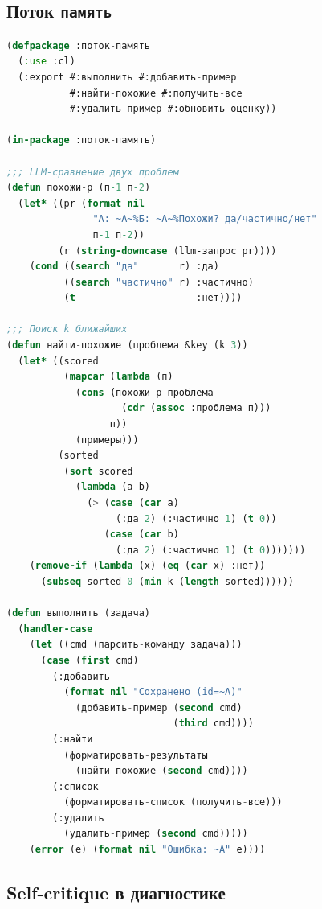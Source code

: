 \documentclass[10pt, oneside]{article}
\begin{document}
\subsection{Поток \texttt{память}}

\begin{lstlisting}[language=CommonLisp,caption={поток-память.lisp}]
(defpackage :поток-память
  (:use :cl)
  (:export #:выполнить #:добавить-пример
           #:найти-похожие #:получить-все
           #:удалить-пример #:обновить-оценку))

(in-package :поток-память)

;;; LLM-сравнение двух проблем
(defun похожи-p (п-1 п-2)
  (let* ((pr (format nil
               "А: ~A~%Б: ~A~%Похожи? да/частично/нет"
               п-1 п-2))
         (r (string-downcase (llm-запрос pr))))
    (cond ((search "да"       r) :да)
          ((search "частично" r) :частично)
          (t                     :нет))))

;;; Поиск k ближайших
(defun найти-похожие (проблема &key (k 3))
  (let* ((scored
          (mapcar (lambda (п)
            (cons (похожи-p проблема
                    (cdr (assoc :проблема п)))
                  п))
            (примеры)))
         (sorted
          (sort scored
            (lambda (a b)
              (> (case (car a)
                   (:да 2) (:частично 1) (t 0))
                 (case (car b)
                   (:да 2) (:частично 1) (t 0)))))))
    (remove-if (lambda (x) (eq (car x) :нет))
      (subseq sorted 0 (min k (length sorted))))))

(defun выполнить (задача)
  (handler-case
    (let ((cmd (парсить-команду задача)))
      (case (first cmd)
        (:добавить
          (format nil "Сохранено (id=~A)"
            (добавить-пример (second cmd)
                             (third cmd))))
        (:найти
          (форматировать-результаты
            (найти-похожие (second cmd))))
        (:список
          (форматировать-список (получить-все)))
        (:удалить
          (удалить-пример (second cmd)))))
    (error (e) (format nil "Ошибка: ~A" e))))
\end{lstlisting}

\subsection{Self-critique в диагностике}
\end{document}
